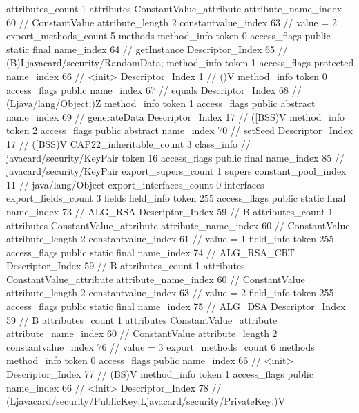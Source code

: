 {{{{{				attributes_count	1
				attributes {
				ConstantValue_attribute {
					attribute_name_index	60		// ConstantValue
					attribute_length	2
					constantvalue_index	63		// value = 2
				}
				}
			}
			}
			export_methods_count	5
			methods {
				method_info {
					token	0
					access_flags	public static final
					name_index	64		// getInstance
					Descriptor_Index	65		// (B)Ljavacard/security/RandomData;
				}
				method_info {
					token	1
					access_flags	protected
					name_index	66		// <init>
					Descriptor_Index	1		// ()V
				}
				method_info {
					token	0
					access_flags	public
					name_index	67		// equals
					Descriptor_Index	68		// (Ljava/lang/Object;)Z
				}
				method_info {
					token	1
					access_flags	public abstract
					name_index	69		// generateData
					Descriptor_Index	17		// ([BSS)V
				}
				method_info {
					token	2
					access_flags	public abstract
					name_index	70		// setSeed
					Descriptor_Index	17		// ([BSS)V
				}
			}
			CAP22_inheritable_count	3
		}
		class_info {		// javacard/security/KeyPair
			token	16
			access_flags	public final
			name_index	85		// javacard/security/KeyPair
			export_supers_count	1
			supers {
				constant_pool_index	11		// java/lang/Object
			}
			export_interfaces_count	0
			interfaces {
			}
			export_fields_count	3
			fields {
			field_info {
				token	255
				access_flags	public static final
				name_index	73		// ALG_RSA
				Descriptor_Index	59		// B
				attributes_count	1
				attributes {
				ConstantValue_attribute {
					attribute_name_index	60		// ConstantValue
					attribute_length	2
					constantvalue_index	61		// value = 1
				}
				}
			}
			field_info {
				token	255
				access_flags	public static final
				name_index	74		// ALG_RSA_CRT
				Descriptor_Index	59		// B
				attributes_count	1
				attributes {
				ConstantValue_attribute {
					attribute_name_index	60		// ConstantValue
					attribute_length	2
					constantvalue_index	63		// value = 2
				}
				}
			}
			field_info {
				token	255
				access_flags	public static final
				name_index	75		// ALG_DSA
				Descriptor_Index	59		// B
				attributes_count	1
				attributes {
				ConstantValue_attribute {
					attribute_name_index	60		// ConstantValue
					attribute_length	2
					constantvalue_index	76		// value = 3
				}
				}
			}
			}
			export_methods_count	6
			methods {
				method_info {
					token	0
					access_flags	public
					name_index	66		// <init>
					Descriptor_Index	77		// (BS)V
				}
				method_info {
					token	1
					access_flags	public
					name_index	66		// <init>
					Descriptor_Index	78		// (Ljavacard/security/PublicKey;Ljavacard/security/PrivateKey;)V
}}}}}
